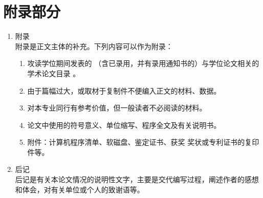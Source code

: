 \section{附录部分}
\begin{enumerate}
    \item 附录\\
        附录是正文主体的补充。下列内容可以作为附录：
        \begin{enumerate}
            \item 攻读学位期间发表的 （含已录用，并有录用通知书的）与学位论文相关的学术论文目录 。
            \item 由于篇幅过大，或取材于复制件不便编入正文的材料、数据。
            \item 对本专业同行有参考价值，但一般读者不必阅读的材料。
            \item 论文中使用的符号意义、单位缩写、程序全文及有关说明书。
            \item 附件：计算机程序清单、软磁盘、鉴定证书、获奖 奖状或专利证书的复印件等。
        \end{enumerate}
    \item 后记\\
        后记是有关本论文情况的说明性文字，主要是交代编写过程，阐述作者的感想和体会，对有关单位或个人的致谢语等。
\end{enumerate} 

